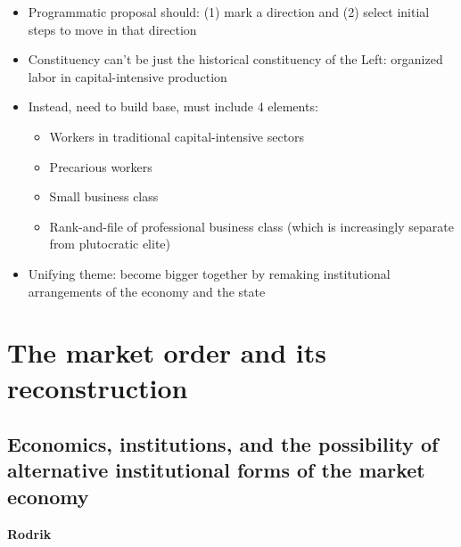 \begin{itemize}
\tightlist
\item
  Programmatic proposal should: (1) mark a direction and (2) select
  initial steps to move in that direction
\item
  Constituency can't be just the historical constituency of the Left:
  organized labor in capital-intensive production
\item
  Instead, need to build base, must include 4 elements:

  \begin{itemize}
  \tightlist
  \item
    Workers in traditional capital-intensive sectors
  \item
    Precarious workers
  \item
    Small business class
  \item
    Rank-and-file of professional business class (which is increasingly
    separate from plutocratic elite)
  \end{itemize}
\item
  Unifying theme: become bigger together by remaking institutional
  arrangements of the economy and the state
\end{itemize}

\hypertarget{the-market-order-and-its-reconstruction}{%
\section{The market order and its
reconstruction}\label{the-market-order-and-its-reconstruction}}

\hypertarget{economics-institutions-and-the-possibility-of-alternative-institutional-forms-of-the-market-economy}{%
\subsection{Economics, institutions, and the possibility of alternative
institutional forms of the market
economy}\label{economics-institutions-and-the-possibility-of-alternative-institutional-forms-of-the-market-economy}}

\textbf{Rodrik}

